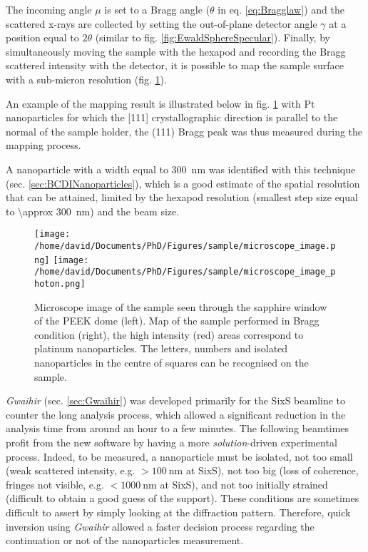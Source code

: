 The incoming angle $\mu$ is set to a Bragg angle ($\theta$ in eq. \ref{eq:Bragglaw}) and the scattered x-rays are collected by setting the out-of-plane detector angle $\gamma$ at a position equal to $2\theta$ (similar to fig. \ref{fig:EwaldSphereSpecular}).
Finally, by simultaneously moving the sample with the hexapod and recording the Bragg scattered intensity with the detector, it is possible to map the sample surface with a sub-micron resolution (fig. \ref{fig:SampleMapping}).

An example of the mapping result is illustrated below in fig. \ref{fig:SampleMapping} with Pt nanoparticles for which the [111] crystallographic direction is parallel to the normal of the sample holder, the (111) Bragg peak was thus measured during the mapping process.

A nanoparticle with a width equal to \qty{300}{\nm} was identified with this technique (sec. \ref{sec:BCDINanoparticles}), which is a good estimate of the spatial resolution that can be attained, limited by the hexapod resolution (smallest step size equal to \qty{\approx 300}{\nm}) and the beam size.

\begin{figure}[!htb]
    \centering
    \texttt{[image: /home/david/Documents/PhD/Figures/sample/microscope\_image.png]}
    \texttt{[image: /home/david/Documents/PhD/Figures/sample/microscope\_image\_photon.png]}
    \caption{
        Microscope image of the sample seen through the sapphire window of the PEEK dome (left).
        Map of the sample performed in Bragg condition (right), the high intensity (red) areas correspond to platinum nanoparticles.
        The letters, numbers and isolated nanoparticles in the centre of squares can be recognised on the sample.
    }
    \label{fig:SampleMapping}
\end{figure}

\textit{Gwaihir} (sec. \ref{sec:Gwaihir}) was developed primarily for the SixS beamline to counter the long analysis process, which allowed a significant reduction in the analysis time from around an hour to a few minutes.
The following beamtimes profit from the new software by having a more \textit{solution}-driven experimental process.
Indeed, to be measured, a nanoparticle must be isolated, not too small (weak scattered intensity, e.g. $>\qty{100}{\nm}$ at SixS), not too big (loss of coherence, fringes not visible, e.g. $<\qty{1000}{\nm}$ at SixS), and not too initially strained (difficult to obtain a good guess of the support).
These conditions are sometimes difficult to assert by simply looking at the diffraction pattern.
Therefore, quick inversion using \textit{Gwaihir} allowed a faster decision process regarding the continuation or not of the nanoparticles measurement.

